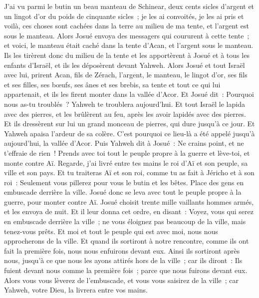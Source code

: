 \begin{multicols}{2}
J'ai vu parmi le butin un beau manteau de Schinear, deux cents sicles d'argent et un lingot d'or du poids de cinquante sicles~; je les ai convoités, je les ai pris et voilà, ces choses sont cachées dans la terre au milieu de ma tente, et l'argent est sous le manteau.
Alors Josué envoya des messagers qui coururent à cette tente~; et voici, le manteau était caché dans la tente d'Acan, et l'argent sous le manteau.
Ils les tirèrent donc du milieu de la tente et les apportèrent à Josué et à tous les enfants d'Israël, et ils les déposèrent devant Yahweh.
Alors Josué et tout Israël avec lui, prirent Acan, fils de Zérach, l'argent, le manteau, le lingot d'or, ses fils et ses filles, ses bœufs, ses ânes et ses brebis, sa tente et tout ce qui lui appartenait, et ils les firent monter dans la vallée d'Acor.
Et Josué dit~: Pourquoi nous as-tu troublés~? Yahweh te troublera aujourd'hui. Et tout Israël le lapida avec des pierres, et les brûlèrent au feu, après les avoir lapidés avec des pierres.
Et ils dressèrent sur lui un grand monceau de pierres, qui dure jusqu'à ce jour. Et Yahweh apaisa l'ardeur de sa colère. C'est pourquoi ce lieu-là a été appelé jusqu'à aujourd'hui, la vallée d'Acor.
\VerseOne{}Puis Yahweh dit à Josué~: Ne crains point, et ne t'effraie de rien~! Prends avec toi tout le peuple propre à la guerre et lève-toi, et monte contre Aï. Regarde, j'ai livré entre tes mains le roi d'Aï et son peuple, sa ville et son pays.
Et tu traiteras Aï et son roi, comme tu as fait à Jéricho et à son roi~: Seulement vous pillerez pour vous le butin et les bêtes. Place des gens en embuscade derrière la ville.
Josué donc se leva avec tout le peuple propre à la guerre, pour monter contre Aï. Josué choisit trente mille vaillants hommes armés, et les envoya de nuit.
Et il leur donna cet ordre, en disant~: Voyez, vous qui serez en embuscade derrière la ville~; ne vous éloignez pas beaucoup de la ville, mais tenez-vous prêts.
Et moi et tout le peuple qui est avec moi, nous nous approcherons de la ville. Et quand ils sortiront à notre rencontre, comme ils ont fait la première fois, nous nous enfuirons devant eux.
Ainsi ils sortiront après nous, jusqu'à ce que nous les ayons attirés hors de la ville~; car ils diront~: Ils fuient devant nous comme la première fois~; parce que nous fuirons devant eux.
Alors vous vous lèverez de l'embuscade, et vous vous saisirez de la ville~; car Yahweh, votre Dieu, la livrera entre vos mains.

\end{multicols}
